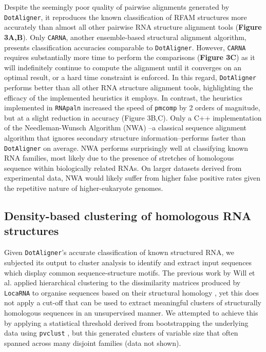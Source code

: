 \documentclass[a4paper,11pt]{article}
\newcommand\dotaligner{\texttt{DotAligner}}
\newcommand\locarna{\texttt{LocaRNA}}
\newcommand\carna{\texttt{CARNA}}
\begin{document}
{Despite the seemingly poor quality of pairwise alignments generated by \dotaligner{}, it 
reproduces the known classification of RFAM structures more accurately than almost all 
other pairwise RNA structure alignment tools (\textbf{Figure 3A,B}). Only \carna{}, 
another ensemble-based structural alignment algorithm, presents classification accuracies
comparable to \dotaligner{}. However,  \carna{} requires substantially more time to perform 
the comparisons (\textbf{Figure 3C}) as it will indefinitely continue to compute the alignment
until it converges on an optimal result, or a hard time constraint is enforced.  In this regard, 
\dotaligner{} performs better than all other RNA structure alignment tools, highlighting 
the efficacy of the implemented  heuristics it employs. In contrast, the heuristics implemented 
in \texttt{RNApaln} increased the speed of \texttt{pmcomp} by 2 orders of magnitude, but
at a slight reduction in accuracy (Figure 3B,C). Only a C++ implementation of the 
Needleman-Wunsch Algorithm (NWA) \cite{needleman1970general}--a classical sequence alignment algorithm that 
ignores secondary structure information--performs faster than \dotaligner{} on average. NWA 
performs surprisingly well at classifying known RNA families, most likely due to the presence
of stretches of homologous sequence within biologically related RNAs. On 
larger datasets derived from experimental data, NWA would likely suffer from 
higher false positive rates given the repetitive nature of higher-eukaryote genomes.\\

\subsection*{ Density-based clustering of homologous RNA structures }

Given \dotaligner{}'s accurate classification of known structured RNA, we subjected its
output to cluster analysis to identify and extract input sequences which display common
sequence-structure motifs. The previous work by Will et al. applied hierarchical clustering 
to the dissimilarity matrices produced by \locarna{} to organise sequences based on their
structural homology \cite{Will17432929}, yet this does not apply a cut-off that can be used 
to extract meaningful clusters of structurally homologous sequences in an unsupervised 
manner. We attempted to achieve this by applying a statistical threshold derived from 
bootstrapping the underlying data using \texttt{pvclust} \cite{suzuki2006pvclust}, but this
generated clusters of variable size that often spanned across many disjoint families 
(data not shown).\\

}
\end{document}

